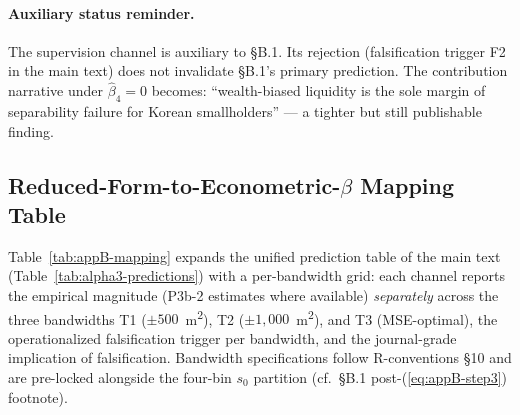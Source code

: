 \documentclass[11pt, a4paper]{article}
\begin{document}
\paragraph{Auxiliary status reminder.} The supervision channel is auxiliary to
\S B.1. Its rejection (falsification trigger F2 in the main text) does not
invalidate \S B.1's primary prediction. The contribution narrative under
$\hat\beta_4 = 0$ becomes: ``wealth-biased liquidity is the sole margin of
separability failure for Korean smallholders'' --- a tighter but still
publishable finding.

\subsection{Reduced-Form-to-Econometric-$\beta$ Mapping Table}
\label{sec:appB-mapping}

Table~\ref{tab:appB-mapping} expands the unified prediction table of the main
text (Table~\ref{tab:alpha3-predictions}) with a per-bandwidth grid: each
channel reports the empirical magnitude (P3b-2 estimates where available)
\emph{separately} across the three bandwidths T1 ($\pm 500$~m\textsuperscript{2}),
T2 ($\pm 1{,}000$~m\textsuperscript{2}), and T3 (MSE-optimal), the
operationalized falsification trigger per bandwidth, and the journal-grade
implication of falsification. Bandwidth specifications follow R-conventions \S 10
and are pre-locked alongside the four-bin $s_0$ partition (cf.\ \S B.1
post-(\ref{eq:appB-step3}) footnote).
\end{document}
